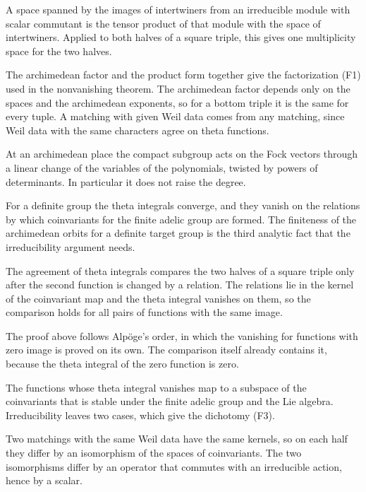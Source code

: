 A space spanned by the images of intertwiners from an irreducible module with
scalar commutant is the tensor product of that module with the space of
intertwiners. Applied to both halves of a square triple, this gives one
multiplicity space for the two halves.

The archimedean factor and the product form together give the factorization
(F1) used in the nonvanishing theorem. The archimedean factor depends only on
the spaces and the archimedean exponents, so for a bottom triple it is the
same for every tuple. A matching with given Weil data comes from any matching,
since Weil data with the same characters agree on theta functions.

At an archimedean place the compact subgroup acts on the Fock vectors through
a linear change of the variables of the polynomials, twisted by powers of
determinants. In particular it does not raise the degree.

For a definite group the theta integrals converge, and they vanish on the
relations by which coinvariants for the finite adelic group are formed. The
finiteness of the archimedean orbits for a definite target group is the third
analytic fact that the irreducibility argument needs.

The agreement of theta integrals compares the two halves of a square triple
only after the second function is changed by a relation. The relations lie in
the kernel of the coinvariant map and the theta integral vanishes on them, so
the comparison holds for all pairs of functions with the same image.

The proof above follows Alpöge's order, in which the vanishing for functions
with zero image is proved on its own. The comparison itself already contains
it, because the theta integral of the zero function is zero.

The functions whose theta integral vanishes map to a subspace of the
coinvariants that is stable under the finite adelic group and the Lie
algebra. Irreducibility leaves two cases, which give the dichotomy (F3).

Two matchings with the same Weil data have the same kernels, so on each half
they differ by an isomorphism of the spaces of coinvariants. The two
isomorphisms differ by an operator that commutes with an irreducible action,
hence by a scalar.


